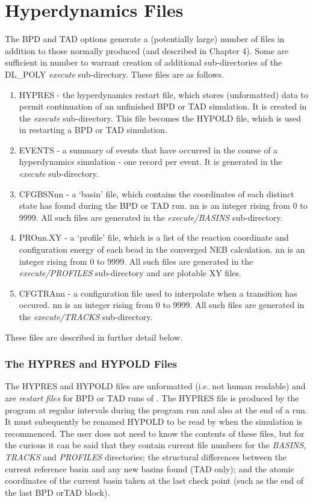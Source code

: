 \section{\D{} Hyperdynamics Files}
\label{hypfiles}

The \D{} BPD and TAD options generate a (potentially large) number of
files in addition to those normally produced (and described in Chapter
4). Some are sufficient in number to warrant creation of additional
sub-directories of the DL\_POLY {\em execute} sub-directory. These
files are as follows.

\begin{enumerate}
\item HYPRES - the hyperdynamics restart file,  which stores 
(unformatted) data to permit continuation of an unfinished BPD or TAD
simulation. It is created in the {\em execute} sub-directory. This
file becomes the HYPOLD file, which is used in restarting a BPD or TAD
simulation.
\item EVENTS - a summary of events that have occurred in the 
course of a hyperdynamics simulation - one record per event. It is
generated in the {\em execute} sub-directory.
\item CFGBSNnn - a `basin' file, which contains the coordinates of each 
distinct state \D{} has found during the BPD or TAD run. nn is an integer
rising from 0 to 9999. All such files are generated in the {\em
execute/BASINS} sub-directory.
\item PROnn.XY - a `profile' file, which is a list of the reaction 
coordinate and configuration energy of each bead in the converged NEB
calculation. nn is an integer rising from 0 to 9999. All such files are
generated in the {\em execute/PROFILES} sub-directory and are plotable
XY files.
\item CFGTRAnn - a configuration file used to interpolate when a 
transition has occured. nn is an integer rising from 0 to 9999.
All such files are generated in the {\em execute/TRACKS} sub-directory.
\end{enumerate}
These files are described in further detail below.

\subsubsection{The HYPRES and HYPOLD Files}
\label{hypresfile}

The HYPRES and HYPOLD files are unformatted (i.e. not human readable)
and are {\em restart files} for BPD or TAD runs of \D{}. The HYPRES file
is produced by the program at regular intervals during the program run
and also at the end of a run. It must subequently be renamed HYPOLD to
be read by \D{} when the simulation is recommenced. The user does not
need to know the contents of these files, but for the curious it can
be said that they contain current file numbers for the {\em BASINS},
{\em TRACKS} and {\em PROFILES} directories; the structural
differences between the current reference basin and any new basins
found (TAD only); and the atomic coordinates of the current basin
taken at the last check point (such as the end of the last BPD orTAD
block).

